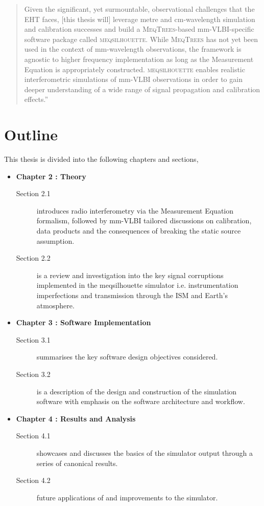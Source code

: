 \begin{quotation}
Given the significant, yet surmountable, observational challenges that the EHT faces, [this thesis will] leverage metre and cm-wavelength simulation and calibration successes and build a \textsc{MeqTrees}-based mm-VLBI-specific software package called \textsc{meqsilhouette}. While \textsc{MeqTrees} has not yet been used in the context of mm-wavelength observations, the framework is agnostic to higher frequency implementation as long as the Measurement Equation is appropriately constructed. \textsc{meqsilhouette} enables realistic interferometric simulations of mm-VLBI observations in order to gain deeper understanding of a wide range of signal propagation and calibration effects.''\\
\citep{Blecher_2016}
\end{quotation}
 
\section{Outline}
This thesis is divided into the following chapters and sections,
\begin{itemize}
 \item {\bf Chapter 2 : Theory} 
 \begin{description}
  \item [Section 2.1] introduces radio interferometry via the Measurement Equation formalism, followed by mm-VLBI tailored discussions on calibration, data products and the consequences of breaking the static source assumption.
  \item [Section 2.2] is a review and investigation into the key signal corruptions implemented in the {\sc meqsilhouette} simulator i.e. instrumentation imperfections and transmission through the ISM and Earth's atmosphere.
 \end{description}

 \item {\bf Chapter 3 : Software Implementation}
 \begin{description}
  \item [Section 3.1] summarises the key software design objectives considered.
  \item [Section 3.2] is a description of the design and construction of the simulation software with emphasis on the software architecture and workflow.
 \end{description}

 
 \item {\bf Chapter 4 : Results and Analysis}
 \begin{description}
  \item  [Section 4.1] showcases and discusses the basics of the simulator output through a series of canonical results.
  \item [Section 4.2] future applications of and improvements to the simulator.
 \end{description}
 

\end{itemize}
















